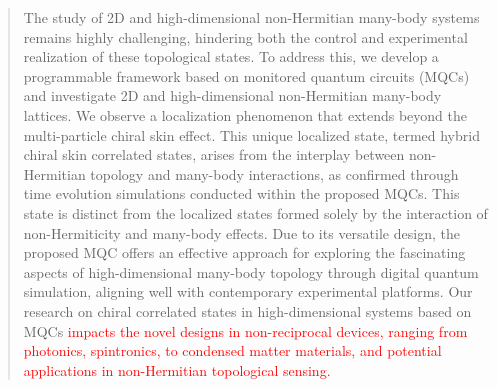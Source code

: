 \documentclass[longbibliography, aps, prx, amsmath, amssymb, amsfonts, twocolumn,superscriptaddress, footinbib]{revtex4-1}
\begin{document}
	
	
	
	\begin{abstract}

		The study of 2D and high-dimensional non-Hermitian many-body systems remains highly challenging, hindering both the control and experimental realization of these topological states.
		To address this, we develop a programmable framework based on monitored quantum circuits (MQCs) and investigate 2D and high-dimensional non-Hermitian many-body lattices.
		We observe a localization phenomenon that extends beyond the multi-particle chiral skin effect. This unique localized state, termed hybrid chiral skin correlated states, arises from the interplay between non-Hermitian topology and many-body interactions, as confirmed through time evolution simulations conducted within the proposed MQCs. This state is distinct from the localized states formed solely by the interaction of non-Hermiticity and many-body effects. Due to its versatile design, the proposed MQC offers an effective approach for exploring the fascinating aspects of high-dimensional many-body topology through digital quantum simulation, aligning well with contemporary experimental platforms.
		Our research on chiral correlated states in high-dimensional systems based on MQCs 
		\textcolor{red}{
		impacts the novel designs in non-reciprocal devices, ranging from photonics, spintronics, to condensed matter materials, and potential applications in non-Hermitian topological sensing.}
	\end{abstract}
	
	
	\maketitle
	
\end{document}

